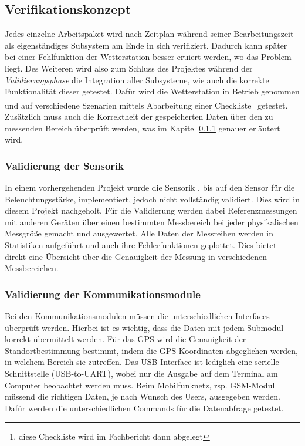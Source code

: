 \subsection{Verifikationskonzept}
Jedes einzelne Arbeitspaket wird nach Zeitplan während seiner Bearbeitungszeit als eigenständiges Subsystem am Ende in sich verifiziert. Dadurch kann später bei einer Fehlfunktion der Wetterstation besser eruiert werden, wo das Problem liegt. Des Weiteren wird also zum Schluss des Projektes während der \textit{Validierungsphase} die Integration aller Subsysteme, wie auch die korrekte Funktionalität dieser getestet. Dafür wird die Wetterstation in Betrieb genommen und auf verschiedene Szenarien mittels Abarbeitung einer Checkliste\footnote{diese Checkliste wird im Fachbericht dann abgelegt} getestet. Zusätzlich muss auch die Korrektheit der gespeicherten Daten über den zu messenden Bereich überprüft werden, was im Kapitel \ref{subsubsec:validierungdersensorik} genauer erläutert wird.\\
\subsubsection{Validierung der Sensorik}
\label{subsubsec:validierungdersensorik}
In einem vorhergehenden Projekt wurde die Sensorik , bis auf den Sensor für die Beleuchtungsstärke, implementiert, jedoch nicht vollständig validiert. Dies wird in diesem Projekt nachgeholt. Für die Validierung werden dabei Referenzmessungen mit anderen Geräten über einen bestimmten Messbereich bei jeder physikalischen Messgröße gemacht und ausgewertet. Alle Daten der Messreihen werden in Statistiken aufgeführt und auch ihre Fehlerfunktionen geplottet. Dies bietet direkt eine Übersicht über die Genauigkeit der Messung in verschiedenen Messbereichen.\\

\subsubsection{Validierung der Kommunikationsmodule}
Bei den Kommunikationsmodulen müssen die unterschiedlichen Interfaces überprüft werden. Hierbei ist es wichtig, dass die Daten mit jedem Submodul korrekt übermittelt werden. Für das GPS wird die Genauigkeit der Standortbestimmung bestimmt, indem die GPS-Koordinaten abgeglichen werden, in welchem Bereich sie zutreffen. Das USB-Interface ist lediglich eine serielle Schnittstelle (USB-to-UART), wobei nur die Ausgabe auf dem Terminal am Computer beobachtet werden muss. Beim Mobilfunknetz, rsp. GSM-Modul müssend die richtigen Daten, je nach Wunsch des Users, ausgegeben werden. Dafür werden die unterschiedlichen Commands für die Datenabfrage getestet.\\
